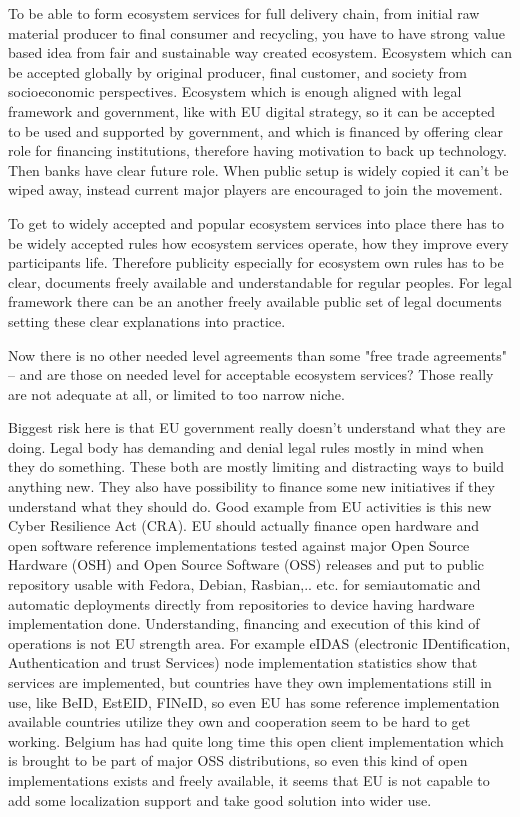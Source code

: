 To be able to form ecosystem services for full delivery chain, from initial raw material producer to final consumer and recycling, you have to have strong value based idea from fair and sustainable way created ecosystem. Ecosystem which can be accepted globally by original producer, final customer, and society from socioeconomic perspectives. Ecosystem which is enough aligned with legal framework and government, like with EU digital strategy, so it can be accepted to be used and supported by government, and which is financed by offering clear role for financing institutions, therefore having motivation to back up technology. Then banks have clear future role. When public setup is widely copied it can't be wiped away, instead current major players are encouraged to join the movement.

To get to widely accepted and popular ecosystem services into place there has to be widely accepted rules how ecosystem services operate, how they improve every participants life. Therefore publicity especially for ecosystem own rules has to be clear, documents freely available and understandable for regular peoples. For legal framework there can be an another freely available public set of legal documents setting these clear explanations into practice.

Now there is no other needed level agreements than some "free trade agreements" -- and are those on needed level for acceptable ecosystem services? Those really are not adequate at all, or limited to too narrow niche.

Biggest risk here is that EU government really doesn't understand what they are doing. Legal body has demanding and denial legal rules mostly in mind when they do something. These both are mostly limiting and distracting ways to build anything new. They also have possibility to finance some new initiatives if they understand what they should do. Good example from EU activities is this new Cyber Resilience Act (CRA)\cite{EU_CRA}. EU should actually finance open hardware and open software reference implementations tested against major Open Source Hardware (OSH) and Open Source Software (OSS) releases and put to public repository usable with Fedora, Debian, Rasbian,.. etc. for semiautomatic and automatic deployments directly from repositories to device having hardware implementation\cite{ISO_IEC_19790} done. Understanding, financing and execution of this kind of operations is not EU strength area. For example eIDAS (electronic IDentification, Authentication and trust Services) node implementation statistics \cite{eIDASnode} show that services are implemented, but countries have they own implementations still in use, like BeID, EstEID, FINeID, so even EU has some reference implementation available countries utilize they own and cooperation seem to be hard to get working. Belgium has had quite long time this open client implementation which is brought to be part of major OSS distributions, so even this kind of open implementations exists and freely available, it seems that EU is not capable to add some localization support and take good solution into wider use.

